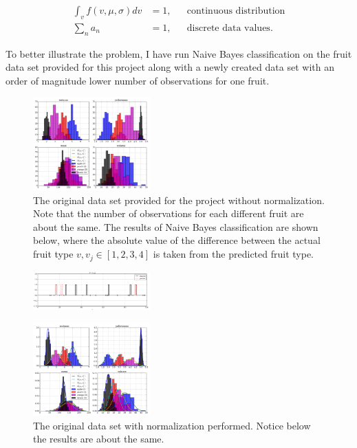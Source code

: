 \begin{align*}
  \int_v f(v,\mu,\sigma) dv &= 1, && \text{continuous distribution} \\
  \sum_n a_n &= 1, && \text{discrete data values}.
\end{align*}

To better illustrate the problem, I have run Naive Bayes classification on the fruit data set provided for this project along with a newly created data set with an order of magnitude lower number of observations for one fruit.

\newpage

\begin{multicols}{2}
\begin{figure}[H]
  \centering
		\includegraphics[width=0.4\textwidth]{images/not_normed_original.png}
  \caption{\scriptsize The original data set provided for the project without normalization.  Note that the number of observations for each different fruit are about the same.  The results of Naive Bayes classification are shown below, where the absolute value of the difference between the actual fruit type $v, v_j \in [1,2,3,4]$ is taken from the predicted fruit type.}
\end{figure}

\begin{figure}[H]
  \centering
		\includegraphics[width=0.4\textwidth]{images/not_normed_original_results.png}
\end{figure}

\begin{figure}[H]
  \centering
		\includegraphics[width=0.4\textwidth]{images/normed_original.png}
  \caption{\scriptsize The original data set with normalization performed.  Notice below the results are about the same.}
\end{figure}


\end{multicols}
